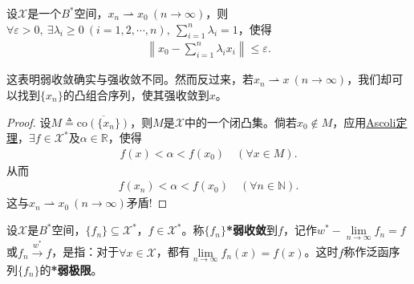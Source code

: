 \documentclass[../../main.tex]{subfiles}%
\begin{document}
\begin{theorem}[Mazur定理]
设$\mathscr{X}$是一个$B^*$空间，$x_n\rightharpoonup x_0\ (n\to\infty)$，则$\forall\varepsilon>0,\ \exists\lambda_i\geqslant0\ (i=1,2,\cdots,n),\ \sum\limits_{i=1}^{n}\lambda_i=1$，使得
\begin{align*}
\left\|x_0-\sum\limits_{i=1}^{n}\lambda_ix_i\right\|\leqslant\varepsilon.
\end{align*}
\end{theorem}
\begin{remark}
这表明弱收敛确实与强收敛不同。然而反过来，若$x_n\rightharpoonup x\ (n\to\infty)$，我们却可以找到$\{x_n\}$的凸组合序列，使其强收敛到$x$。
\end{remark}
\begin{proof}

设$M\triangleq\overline{\mathrm{co}(\{x_n\})}$，则$M$是$\mathscr{X}$中的一个闭凸集。倘若$x_0\notin M$，应用\hyperref[corollary:泛函分析--Ascoli定理]{Ascoli定理}，$\exists f\in\mathscr{X}^*$及$\alpha\in\mathbb{R}$，使得
\begin{align*}
f(x)<\alpha<f(x_0)\quad(\forall x\in M).
\end{align*}
从而
\begin{align*}
f(x_n)<\alpha<f(x_0)\quad(\forall n\in\mathbb{N}).
\end{align*}
这与$x_n\rightharpoonup x_0\ (n\to\infty)$矛盾!

\end{proof}

\begin{definition}
设$\mathscr{X}$是$B^*$空间，$\{f_n\}\subseteq\mathscr{X}^*$，$f\in\mathscr{X}^*$。称$\{f_n\}$\textbf{*弱收敛}到$f$，记作$w^*-\lim\limits_{n\to\infty}f_n=f$或$f_n \xrightarrow{w^*} f$，是指：对于$\forall x\in\mathscr{X}$，都有$\lim\limits_{n\to\infty}f_n(x)=f(x)$。这时$f$称作泛函序列$\{f_n\}$的\textbf{*弱极限}。
\end{definition}
\end{document}
